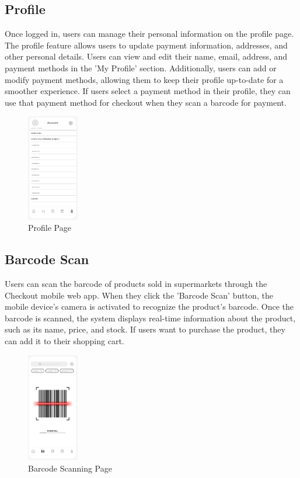 \documentclass[conference]{IEEEtran}
\begin{document}
\subsection{Profile}
Once logged in, users can manage their personal information on the profile page. The profile feature allows users to update payment information, addresses, and other personal details. Users can view and edit their name, email, address, and payment methods in the 'My Profile' section. Additionally, users can add or modify payment methods, allowing them to keep their profile up-to-date for a smoother experience.
If users select a payment method in their profile, they can use that payment method for checkout when they scan a barcode for payment.

\begin{figure}[H]  %
    \centering  %
    \includegraphics[width=0.2\textwidth]{account.PNG}  %
    \caption{Profile Page}  %
\end{figure}


\subsection{Barcode Scan}
Users can scan the barcode of products sold in supermarkets through the Checkout mobile web app. When they click the 'Barcode Scan' button, the mobile device's camera is activated to recognize the product’s barcode. Once the barcode is scanned, the system displays real-time information about the product, such as its name, price, and stock. If users want to purchase the product, they can add it to their shopping cart.

\begin{figure}[H]  %
    \centering  %
    \includegraphics[width=0.2\textwidth]{barcode.PNG}  %
    \caption{Barcode Scanning Page}  %
\end{figure}
\end{document}
